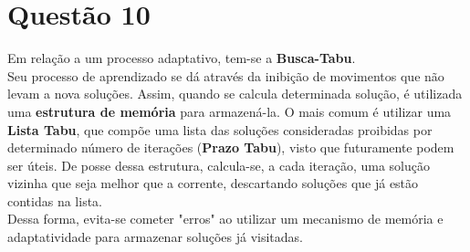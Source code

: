 	\section*{Questão 10}
	Em relação a um processo adaptativo, tem-se a \textbf{Busca-Tabu}.\\
	Seu processo de aprendizado se dá através da inibição de movimentos que não levam a nova soluções. Assim, quando se calcula determinada solução, é utilizada uma \textbf{estrutura de memória} para armazená-la. O mais comum é utilizar uma \textbf{Lista Tabu}, que compõe uma lista das soluções consideradas proibidas por determinado número de iterações (\textbf{Prazo Tabu}), visto que futuramente podem ser úteis. De posse dessa estrutura, calcula-se, a cada iteração, uma solução vizinha que seja melhor que a corrente, descartando soluções que já estão contidas na lista.\\
	Dessa forma, evita-se cometer "erros" ao utilizar um mecanismo de memória e adaptatividade para armazenar soluções já visitadas.

	
	
	\nocite{*}


